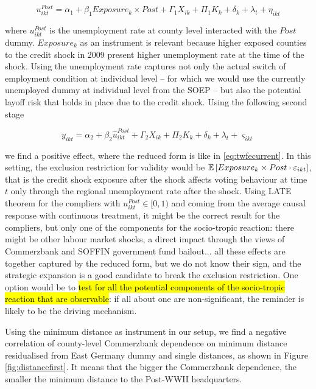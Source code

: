 \documentclass[11pt]{article}
\begin{document}
\begin{equation}
    u_{ikt}^{Post} = \alpha_1 + \beta_1 Exposure_k \times Post + \Gamma_1 X_{ik} + \Pi_1 K_{k} + \delta_k + \lambda_t + \eta_{ikt}\label{eq:uempfirst}
\end{equation}

where $u_{ikt}^{Post}$ is the unemployment rate at county level interacted with the $Post$ dummy. $Exposure_k$ as an instrument is relevant because higher exposed counties to the credit shock in 2009 present higher unemployment rate at the time of the shock. Using the unemployment rate captures not only the actual switch of employment condition at individual level -- for which we would use the currently unemployed dummy at individual level from the SOEP -- but also the potential layoff risk that holds in place due to the credit shock. Using the following second stage

\begin{equation}
    y_{ikt} = \alpha_2 + \beta_2 \hat{u}_{ikt}^{Post} + \Gamma_2 X_{ik} + \Pi_2 K_{k} + \delta_k + \lambda_t + \varsigma_{ikt}\label{eq:uempsec}
\end{equation}

we find a positive effect, where the reduced form is like in \eqref{eq:twfecurrent}. In this setting, the exclusion restriction for validity would be $\mathbb{E}\left[ Exposure_k \times Post \cdot \varepsilon_{ikt} \right]$, that is the credit shock exposure after the shock affects voting behaviour at time $t$ only through the regional unemployment rate after the shock. Using LATE theorem for the compliers with $u_{ikt}^{Post} \in [0,1)$ and coming from the average causal response with continuous treatment, it might be the correct result for the compliers, but only one of the components for the socio-tropic reaction: there might be other labour market shocks, a direct impact through the views of Commerzbank and SOFFIN government fund bailout... all these effects are together captured by the reduced form, but we do not know their sign, and the strategic expansion is a good candidate to break the exclusion restriction. One option would be to \hl{test for all the potential components of the socio-tropic reaction that are observable}: if all about one are non-significant, the reminder is likely to be the driving mechanism.

Using the minimum distance as instrument in our setup, we find a negative correlation of county-level Commerzbank dependence on minimum distance residualised from East Germany dummy and single distances, as shown in Figure \ref{fig:distancefirst}. It means that the bigger the Commerzbank dependence, the smaller the minimum distance to the Post-WWII headquarters.
\end{document}
